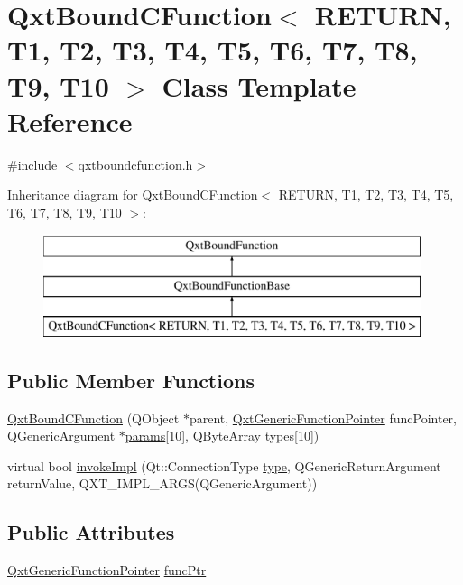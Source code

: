\hypertarget{class_qxt_bound_c_function}{\section{Qxt\-Bound\-C\-Function$<$ R\-E\-T\-U\-R\-N, T1, T2, T3, T4, T5, T6, T7, T8, T9, T10 $>$ Class Template Reference}
\label{class_qxt_bound_c_function}
}


{\ttfamily \#include $<$qxtboundcfunction.\-h$>$}

Inheritance diagram for Qxt\-Bound\-C\-Function$<$ R\-E\-T\-U\-R\-N, T1, T2, T3, T4, T5, T6, T7, T8, T9, T10 $>$\-:\begin{figure}[H]
\begin{center}
\leavevmode
\includegraphics[height=3.000000cm]{class_qxt_bound_c_function}
\end{center}
\end{figure}
\subsection*{Public Member Functions}
\begin{DoxyCompactItemize}
\item 
\hyperlink{class_qxt_bound_c_function_a922201802bd1b782d156921207eba04a}{Qxt\-Bound\-C\-Function} (Q\-Object $\ast$parent, \hyperlink{class_qxt_generic_function_pointer}{Qxt\-Generic\-Function\-Pointer} func\-Pointer, Q\-Generic\-Argument $\ast$\hyperlink{glext_8h_afeb6390ab3bc8a0e96a88aff34d52288}{params}\mbox{[}10\mbox{]}, Q\-Byte\-Array types\mbox{[}10\mbox{]})
\item 
virtual bool \hyperlink{class_qxt_bound_c_function_a95264ef5e8f2ee39c378e9860b64f69f}{invoke\-Impl} (Qt\-::\-Connection\-Type \hyperlink{glext_8h_a7d05960f4f1c1b11f3177dc963a45d86}{type}, Q\-Generic\-Return\-Argument return\-Value, Q\-X\-T\-\_\-\-I\-M\-P\-L\-\_\-A\-R\-G\-S(Q\-Generic\-Argument))
\end{DoxyCompactItemize}
\subsection*{Public Attributes}
\begin{DoxyCompactItemize}
\item 
\hyperlink{class_qxt_generic_function_pointer}{Qxt\-Generic\-Function\-Pointer} \hyperlink{class_qxt_bound_c_function_ac336d2b9179df94116bd5278d0a34e2d}{func\-Ptr}
\end{DoxyCompactItemize}


